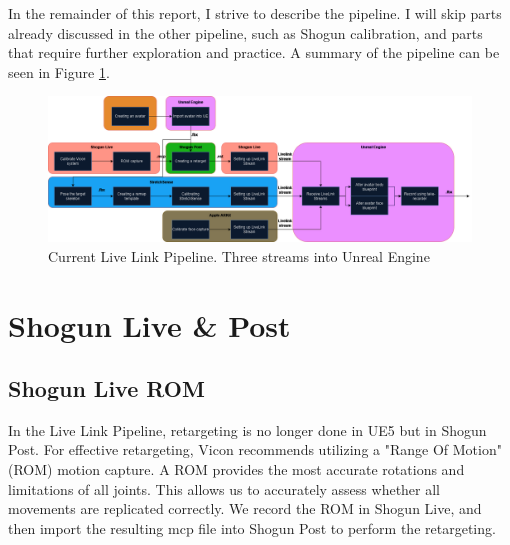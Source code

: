 \documentclass{uva-inf-article}
\begin{document}
In the remainder of this report, I strive to describe the pipeline. I will skip parts already discussed in the other pipeline, such as Shogun calibration, and parts that require further exploration and practice. A summary of the pipeline can be seen in Figure \ref{fig:pipeline}.

\begin{landscape}
\vspace*{\fill}
\begin{figure}[hbt!]
    \centering
    \includegraphics[width=1.5\textheight]{imgs/pipeline16-2-24.png}
    \caption{Current Live Link Pipeline. Three streams into Unreal Engine}
    \label{fig:pipeline}
\end{figure}
\vspace*{\fill}
\end{landscape}



\section{Shogun Live \& Post}
\subsection{Shogun Live ROM}
In the Live Link Pipeline, retargeting is no longer done in UE5 but in Shogun Post. For effective retargeting, Vicon recommends utilizing a "Range Of Motion" (ROM) motion capture. A ROM provides the most accurate rotations and limitations of all joints. This allows us to accurately assess whether all movements are replicated correctly. We record the ROM in Shogun Live, and then import the resulting mcp file into Shogun Post to perform the retargeting.
\end{document}
